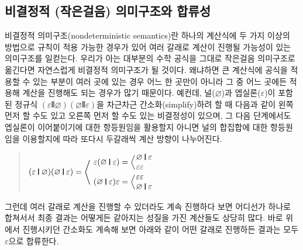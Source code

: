 \subsection{비결정적 (작은걸음) 의미구조와 합류성}
비결정적 의미구조(nondeterministic semantics)란 하나의 계산식에
두 가지 이상의 방법으로 규칙이 적용 가능한 경우가 있어 여러 갈래로
계산이 진행될 가능성이 있는 의미구조를 일컫는다. 우리가 아는
대부분의 수학 공식을 그대로 작은걸음 의미구조로 옮긴다면 자연스럽게
비결정적 의미구조가 될 것이다. 왜냐하면 큰 계산식에 공식을 적용할 수 있는
부분이 여러 곳에 있는 경우 어느 한 곳만이 아니라 그 중 어느 곳에든
적용해 계산을 진행해도 되는 경우가 많기 때문이다. 예컨데,
널($\varnothing$)과 엡실론($\varepsilon$)이 포함된 정규식
$(\varepsilon\VERT \varnothing)(\varnothing\VERT \varepsilon)$을
차근차근 간소화(simplify)하려 할 때 다음과 같이 왼쪽 먼저 할 수도 있고
오른쪽 먼저 할 수도 있는 비결정성이 있으며, 그 다음 단계에서도
엡실론이 이어붙이기에 대한 항등원임을 활용할지 아니면
널의 합집합에 대한 항등원임을 이용할지에 따라 또다시
두갈래씩 계산 방향이 나누어진다.
\begin{quote}
\(
(\varepsilon\VERT \varnothing)(\varnothing\VERT \varepsilon) =
\left<\phantom{\begin{array}{l}.\\[4ex].\end{array}}\hspace*{-4ex}\right.
\begin{array}{l}
  \varepsilon(\varnothing\VERT \varepsilon) =
     \Big<\hspace*{-1ex}
     \begin{array}{l}
       \varnothing\VERT \varepsilon \\
       \varepsilon\varepsilon
     \end{array}
  \\[1ex]
  (\varnothing\VERT \varepsilon)\varepsilon =
     \Big<\hspace*{-1ex}
     \begin{array}{l}
      \varepsilon\varepsilon  \\
      \varnothing\VERT \varepsilon
     \end{array}
\end{array}
\)
\end{quote}
그런데 여러 갈래로 계산을 진행할 수 있더라도 계속 진행하다 보면
어디선가 하나로 합쳐서서 최종 결과는 어떻게든 같아지는 성질을 가진
계산들도 상당히 많다. 바로 위에서 진행시키던 간소화도 계속해 보면
아래와 같이 어떤 갈래로 진행하든 결과는 모두 $\varepsilon$으로
합류한다.
